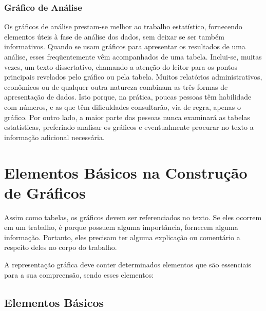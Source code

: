 \subsubsection{Gráfico de Análise}

Os gráficos de análise prestam-se melhor ao trabalho estatístico, fornecendo elementos úteis à fase de análise dos dados, sem deixar se ser também informativos. Quando se usam gráficos para apresentar os resultados de uma análise, esses freqüentemente vêm acompanhados de uma tabela. Inclui-se, muitas vezes, um texto dissertativo, chamando a atenção do leitor para os pontos principais revelados pelo gráfico ou pela tabela. Muitos relatórios administrativos, econômicos ou de qualquer outra natureza combinam as três formas de apresentação de dados. Isto porque, na prática, poucas pessoas têm habilidade com números, e as que têm dificuldades consultarão, via de regra, apenas o gráfico. Por outro lado, a maior parte das pessoas nunca examinará as tabelas estatísticas, preferindo analisar os gráficos e eventualmente procurar no texto a informação adicional necessária.\vskip0.3cm


\newpage
\section{Elementos  Básicos na Construção de Gráficos}

Assim como tabelas, os gráficos devem ser referenciados no texto. Se eles ocorrem em um trabalho, é porque possuem alguma importância, fornecem alguma informação. Portanto, eles precisam ter alguma explicação ou comentário a respeito deles no corpo do trabalho.\vskip0.3cm 

A representação gráfica deve conter determinados elementos que são essenciais para a sua compreensão, sendo esses elementos:

\subsection{Elementos Básicos}

